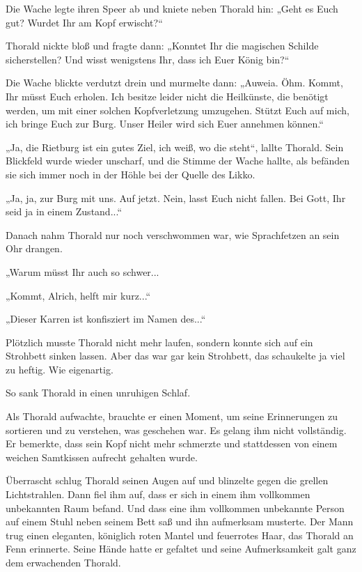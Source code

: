 Die Wache legte ihren Speer ab und kniete neben Thorald hin: „Geht es Euch gut? Wurdet Ihr am Kopf erwischt?“

Thorald nickte bloß und fragte dann: „Konntet Ihr die magischen Schilde sicherstellen? Und wisst wenigstens Ihr, dass ich Euer König bin?“

Die Wache blickte verdutzt drein und murmelte dann: „Auweia. Öhm. Kommt, Ihr müsst Euch erholen. Ich besitze leider nicht die Heilkünste, die benötigt werden, um mit einer solchen Kopfverletzung umzugehen. Stützt Euch auf mich, ich bringe Euch zur Burg. Unser Heiler wird sich Euer annehmen können.“

„Ja, die Rietburg ist ein gutes Ziel, ich weiß, wo die steht“, lallte Thorald. Sein Blickfeld wurde wieder unscharf, und die Stimme der Wache hallte, als befänden sie sich immer noch in der Höhle bei der Quelle des Likko.

„Ja, ja, zur Burg mit uns. Auf jetzt. Nein, lasst Euch nicht fallen. Bei Gott, Ihr seid ja in einem Zustand...“

Danach nahm Thorald nur noch verschwommen war, wie Sprachfetzen an sein Ohr drangen.

„Warum müsst Ihr auch so schwer...

„Kommt, Alrich, helft mir kurz...“

„Dieser Karren ist konfisziert im Namen des...“

Plötzlich musste Thorald nicht mehr laufen, sondern konnte sich auf ein Strohbett sinken lassen. Aber das war gar kein Strohbett, das schaukelte ja viel zu heftig. Wie eigenartig.

So sank Thorald in einen unruhigen Schlaf.



\trennzeichen



Als Thorald aufwachte, brauchte er einen Moment, um seine Erinnerungen zu sortieren und zu verstehen, was geschehen war. Es gelang ihm nicht vollständig. Er bemerkte, dass sein Kopf nicht mehr schmerzte und stattdessen von einem weichen Samtkissen aufrecht gehalten wurde.

Überrascht schlug Thorald seinen Augen auf und blinzelte gegen die grellen Lichtstrahlen. Dann fiel ihm auf, dass er sich in einem ihm vollkommen unbekannten Raum befand. Und dass eine ihm vollkommen unbekannte Person auf einem Stuhl neben seinem Bett saß und ihn aufmerksam musterte. Der Mann trug einen eleganten, königlich roten Mantel und feuerrotes Haar, das Thorald an Fenn erinnerte. Seine Hände hatte er gefaltet und seine Aufmerksamkeit galt ganz dem erwachenden Thorald.

